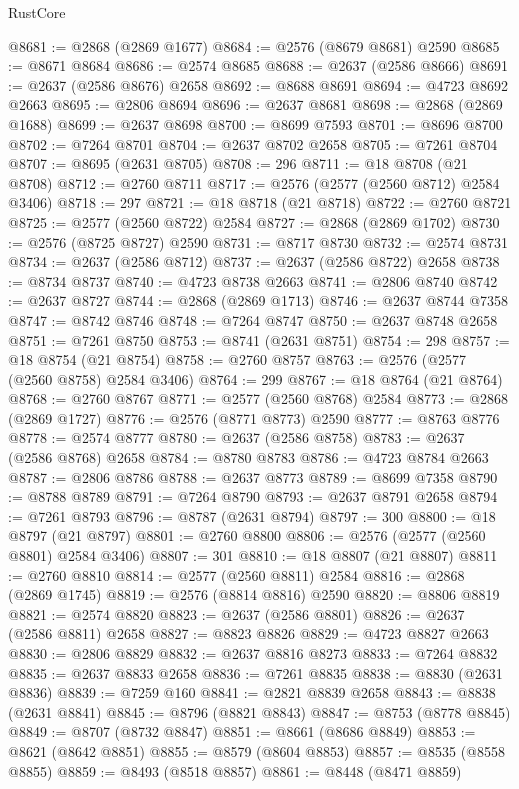 \begin{lexlean}{RustCore}
\begin{coremodule}
@8681 := @2868 (@2869 @1677)
@8684 := @2576 (@8679 @8681) @2590
@8685 := @8671 @8684
@8686 := @2574 @8685
@8688 := @2637 (@2586 @8666)
@8691 := @2637 (@2586 @8676) @2658
@8692 := @8688 @8691
@8694 := @4723 @8692 @2663
@8695 := @2806 @8694
@8696 := @2637 @8681
@8698 := @2868 (@2869 @1688)
@8699 := @2637 @8698
@8700 := @8699 @7593
@8701 := @8696 @8700
@8702 := @7264 @8701
@8704 := @2637 @8702 @2658
@8705 := @7261 @8704
@8707 := @8695 (@2631 @8705)
@8708 := 296
@8711 := @18 @8708 (@21 @8708)
@8712 := @2760 @8711
@8717 := @2576 (@2577 (@2560 @8712) @2584 @3406)
@8718 := 297
@8721 := @18 @8718 (@21 @8718)
@8722 := @2760 @8721
@8725 := @2577 (@2560 @8722) @2584
@8727 := @2868 (@2869 @1702)
@8730 := @2576 (@8725 @8727) @2590
@8731 := @8717 @8730
@8732 := @2574 @8731
@8734 := @2637 (@2586 @8712)
@8737 := @2637 (@2586 @8722) @2658
@8738 := @8734 @8737
@8740 := @4723 @8738 @2663
@8741 := @2806 @8740
@8742 := @2637 @8727
@8744 := @2868 (@2869 @1713)
@8746 := @2637 @8744 @7358
@8747 := @8742 @8746
@8748 := @7264 @8747
@8750 := @2637 @8748 @2658
@8751 := @7261 @8750
@8753 := @8741 (@2631 @8751)
@8754 := 298
@8757 := @18 @8754 (@21 @8754)
@8758 := @2760 @8757
@8763 := @2576 (@2577 (@2560 @8758) @2584 @3406)
@8764 := 299
@8767 := @18 @8764 (@21 @8764)
@8768 := @2760 @8767
@8771 := @2577 (@2560 @8768) @2584
@8773 := @2868 (@2869 @1727)
@8776 := @2576 (@8771 @8773) @2590
@8777 := @8763 @8776
@8778 := @2574 @8777
@8780 := @2637 (@2586 @8758)
@8783 := @2637 (@2586 @8768) @2658
@8784 := @8780 @8783
@8786 := @4723 @8784 @2663
@8787 := @2806 @8786
@8788 := @2637 @8773
@8789 := @8699 @7358
@8790 := @8788 @8789
@8791 := @7264 @8790
@8793 := @2637 @8791 @2658
@8794 := @7261 @8793
@8796 := @8787 (@2631 @8794)
@8797 := 300
@8800 := @18 @8797 (@21 @8797)
@8801 := @2760 @8800
@8806 := @2576 (@2577 (@2560 @8801) @2584 @3406)
@8807 := 301
@8810 := @18 @8807 (@21 @8807)
@8811 := @2760 @8810
@8814 := @2577 (@2560 @8811) @2584
@8816 := @2868 (@2869 @1745)
@8819 := @2576 (@8814 @8816) @2590
@8820 := @8806 @8819
@8821 := @2574 @8820
@8823 := @2637 (@2586 @8801)
@8826 := @2637 (@2586 @8811) @2658
@8827 := @8823 @8826
@8829 := @4723 @8827 @2663
@8830 := @2806 @8829
@8832 := @2637 @8816 @8273
@8833 := @7264 @8832
@8835 := @2637 @8833 @2658
@8836 := @7261 @8835
@8838 := @8830 (@2631 @8836)
@8839 := @7259 @160
@8841 := @2821 @8839 @2658
@8843 := @8838 (@2631 @8841)
@8845 := @8796 (@8821 @8843)
@8847 := @8753 (@8778 @8845)
@8849 := @8707 (@8732 @8847)
@8851 := @8661 (@8686 @8849)
@8853 := @8621 (@8642 @8851)
@8855 := @8579 (@8604 @8853)
@8857 := @8535 (@8558 @8855)
@8859 := @8493 (@8518 @8857)
@8861 := @8448 (@8471 @8859)

\end{coremodule}
\end{lexlean}
